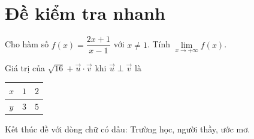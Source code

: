 \documentclass[12pt]{article}
\begin{document}
\section*{Đề kiểm tra nhanh}
Cho hàm số $f(x)=\dfrac{2x+1}{x-1}$ với $x\neq 1$. Tính $\lim\limits_{x\to+\infty} f(x)$.

\begin{ex}
Giá trị của $\sqrt{16}+\vec{u}\cdot\vec{v}$ khi $\vec u\perp\vec v$ là
\end{ex}

\begin{tabular}{|c|c|c|}
\hline
$x$ & $1$ & $2$ \\ \hline
$y$ & $3$ & $5$ \\ \hline
\end{tabular}

Kết thúc đề với dòng chữ có dấu: Trường học, người thầy, ước mơ.
\end{document}
